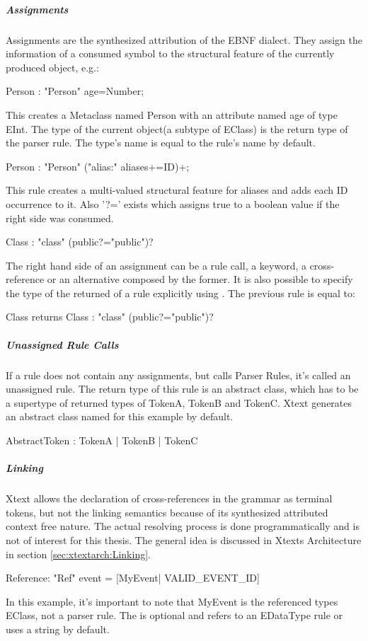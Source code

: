 \subparagraph{Assignments}
Assignments are the synthesized attribution of the EBNF dialect. They assign the information of a consumed symbol to the structural feature of the currently produced object, e.g.:
\begin{xtxt}
Person : "Person" age=Number;
\end{xtxt}
This creates a Metaclass named Person with an attribute named age of type EInt. 
The type of the current object(a subtype of EClass) is the return type of the parser rule. The type's name is equal to the rule's name by default.
\begin{xtxt}
Person : "Person" ("alias:" aliases+=ID)+;
\end{xtxt}
This rule creates a multi-valued structural feature for aliases and adds each ID occurrence to it. Also '?=' exists which assigns true to a boolean value if the right side was consumed.
\begin{xtxt}
Class : "class" (public?="public")?
\end{xtxt}
The right hand side of an assignment can be a rule call, a keyword, a cross-reference or an alternative composed by the former. It is also possible to specify the type of the returned  of a rule explicitly using . The previous rule is equal to:
\begin{xtxt}
Class returns Class : "class" (public?="public")?
\end{xtxt}

\subparagraph{Unassigned Rule Calls}
If a rule does not contain any assignments, but calls Parser Rules, it's called an unassigned rule. The return type of this rule is an abstract class, which has to be a supertype of returned types of TokenA, TokenB and TokenC. Xtext generates an abstract class named  for this example by default.
\begin{xtxt}
AbstractToken :	TokenA |	TokenB |	TokenC
\end{xtxt}


\subparagraph{Linking}
Xtext allows the declaration of cross-references in the grammar as terminal tokens, but not the linking semantics because of its synthesized attributed context free nature. The actual resolving process is done programmatically and is not of interest for this thesis. The general idea is discussed in Xtexts Architecture in section \ref{sec:xtextarch:Linking}. 
\begin{xtxt}
Reference:  "Ref" event = [MyEvent| VALID_EVENT_ID]
\end{xtxt}
In this example, it's important to note that MyEvent is the referenced types EClass, not a parser rule. The  is optional and refers to an EDataType rule or uses a string by default.

